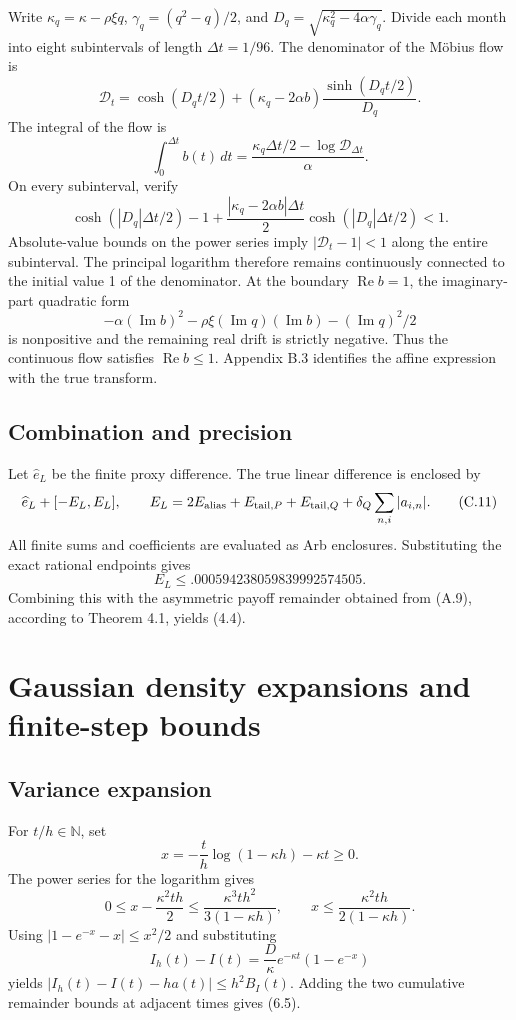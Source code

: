 Write \(\kappa_q=\kappa-\rho\xi q\), \(\gamma_q=(q^2-q)/2\), and \(D_q=\sqrt{\kappa_q^2-4\alpha\gamma_q}\). Divide each month into eight subintervals of length \(\Delta t=1/96\). The denominator of the M\"obius flow is
\[
\mathcal D_t=\cosh(D_qt/2)
+(\kappa_q-2\alpha b)\frac{\sinh(D_qt/2)}{D_q}.
\]
The integral of the flow is
\[
\int_0^{\Delta t}b(t)\,dt
=\frac{\kappa_q\Delta t/2-\log\mathcal D_{\Delta t}}{\alpha}.
\tag{C.9}
\]
On every subinterval, verify
\[
\cosh(|D_q|\Delta t/2)-1+
\frac{|\kappa_q-2\alpha b|\Delta t}{2}
\cosh(|D_q|\Delta t/2)<1.
\tag{C.10}
\]
Absolute-value bounds on the power series imply \(|\mathcal D_t-1|<1\) along the entire subinterval. The principal logarithm therefore remains continuously connected to the initial value 1 of the denominator. At the boundary \(\operatorname{Re}b=1\), the imaginary-part quadratic form
\[
-\alpha(\operatorname{Im}b)^2
-\rho\xi(\operatorname{Im}q)(\operatorname{Im}b)
-(\operatorname{Im}q)^2/2
\]
is nonpositive and the remaining real drift is strictly negative. Thus the continuous flow satisfies \(\operatorname{Re}b\le1\). Appendix B.3 identifies the affine expression with the true transform.

\subsection{Combination and precision}

Let \(\widehat e_L\) be the finite proxy difference. The true linear difference is enclosed by
\[
\widehat e_L+
[-E_L,E_L],\qquad
E_L=2E_{\rm alias}+E_{{\rm tail},P}
+E_{{\rm tail},Q}+\delta_Q\sum_{n,i}|a_{i,n}|.
\tag{C.11}
\]
All finite sums and coefficients are evaluated as Arb enclosures. Substituting the exact rational endpoints gives
\[
E_L\le.000594238059839992574505.
\]
Combining this with the asymmetric payoff remainder obtained from (A.9), according to Theorem 4.1, yields (4.4).


\section{Gaussian density expansions and finite-step bounds}

\subsection{Variance expansion}

For \(t/h\in\mathbb N\), set
\[
x=-\frac th\log(1-\kappa h)-\kappa t\ge0.
\]
The power series for the logarithm gives
\[
0\le x-\frac{\kappa^2th}{2}
\le\frac{\kappa^3th^2}{3(1-\kappa h)},\qquad
x\le\frac{\kappa^2th}{2(1-\kappa h)}.
\]
Using \(|1-e^{-x}-x|\le x^2/2\) and substituting
\[
I_h(t)-I(t)=\frac D\kappa e^{-\kappa t}(1-e^{-x})
\]
yields \(|I_h(t)-I(t)-ha(t)|\le h^2B_I(t)\).
Adding the two cumulative remainder bounds at adjacent times gives (6.5).

